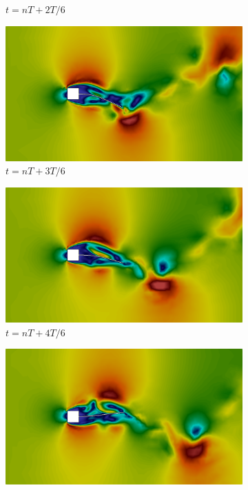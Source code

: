 \begin{figure}[h!]
\begin{subfigure}[b]{0.32\textwidth}
        \caption{$t=nT+2T/6$}
    \end{subfigure}
    \begin{subfigure}[b]{0.32\textwidth}
        \includegraphics[width=\linewidth]{Figuras/FSI-prism2/vT4.png}
        \caption{$t=nT+3T/6$}
    \end{subfigure}
    \begin{subfigure}[b]{0.32\textwidth}
        \includegraphics[width=\linewidth]{Figuras/FSI-prism2/vT5.png}
        \caption{$t=nT+4T/6$}
    \end{subfigure}
    \begin{subfigure}[b]{0.32\textwidth}
        \includegraphics[width=\linewidth]{Figuras/FSI-prism2/vT6.png}

\end{subfigure}
\end{figure}
